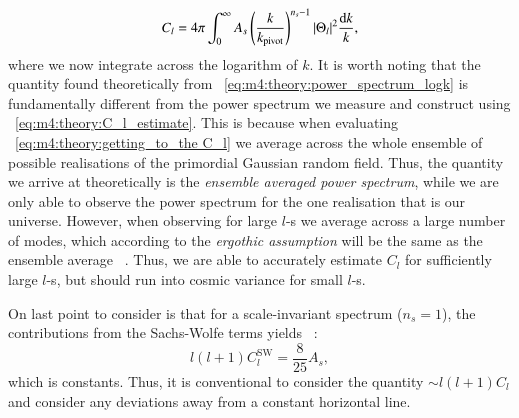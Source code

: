         \begin{equation}\label{eq:m4:theory:power_spectrum_logk}
            C_l = 4\pi\int_0^\infty A_s\left(\frac{k}{k_\mathrm{pivot}}\right)^{n_s-1}\abs{\Theta_l}^2\frac{\mathrm{d} k}{k},
        \end{equation}
        where we now integrate across the logarithm of $k$. It is worth noting that the quantity found theoretically from ~\cref{eq:m4:theory:power_spectrum_logk} is fundamentally different from the power spectrum we measure and construct using ~\cref{eq:m4:theory:C_l_estimate}. This is because when evaluating ~\cref{eq:m4:theory:getting_to_the C_l} we average across the whole ensemble of possible realisations of the primordial Gaussian random field. Thus, the quantity we arrive at theoretically is the \textit{ensemble averaged power spectrum}, while we are only able to observe the power spectrum for the one realisation that is our universe. However, when observing for large $l$-s we average across a large number of modes, which according to the \textit{ergothic assumption} will be the same as the ensemble average ~\cite{AST5220LectureNotes}. Thus, we are able to accurately estimate $C_l$ for sufficiently large $l$-s, but should run into cosmic variance for small $l$-s. 

        On last point to consider is that for a scale-invariant spectrum ($n_s=1$), the contributions from the Sachs-Wolfe terms yields ~\cite[Eq. 9.80]{dodelson2020modern}:
        \begin{equation}
            l(l+1)C_l^\mathrm{SW} = \frac{8}{25} A_s,
        \end{equation}
        which is constants. Thus, it is conventional to consider the quantity $\sim l(l+1)C_l$ and consider any deviations away from a constant horizontal line. 

